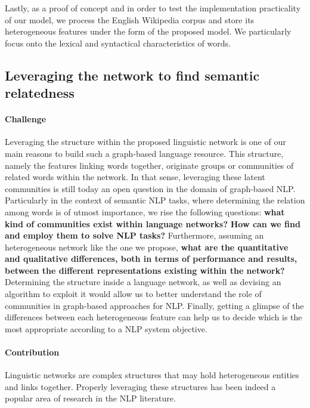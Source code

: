 Lastly, as a proof of concept and in order to test the implementation practicality of our model, we process the English Wikipedia corpus and store its heterogeneous features under the form of the proposed model. We particularly focus onto the lexical and syntactical characteristics of words.

\subsection{Leveraging the network to find semantic relatedness}
\paragraph{Challenge}
Leveraging the structure within the proposed linguistic network is one of our main reasons to build such a graph-based language resource. This structure, namely the features linking words  together, originate groups or communities of related words within the network. In that sense, leveraging these latent communities is still today an open question in the domain of graph-based NLP. Particularly in the context of semantic NLP tasks, where determining the relation among words is of utmost importance, we rise the following questions: \textbf{what kind of communities exist within language networks?} \textbf{How can we find and employ them to solve NLP tasks?} Furthermore, assuming an heterogeneous network like the one we propose, \textbf{what are the quantitative and qualitative differences, both in terms of performance and results, between the different representations existing within the network?} Determining the structure inside a language network, as well as devising an algorithm to exploit it would allow us to better understand the role of communities in  graph-based approaches for NLP. Finally, getting a glimpse of the differences between each heterogeneous feature can help us to decide which is the most appropriate according to a NLP system objective. 


\paragraph{Contribution}
Linguistic networks are complex structures that may hold  heterogeneous entities and links together. Properly leveraging these structures has been indeed a popular area of research in the NLP literature. 

